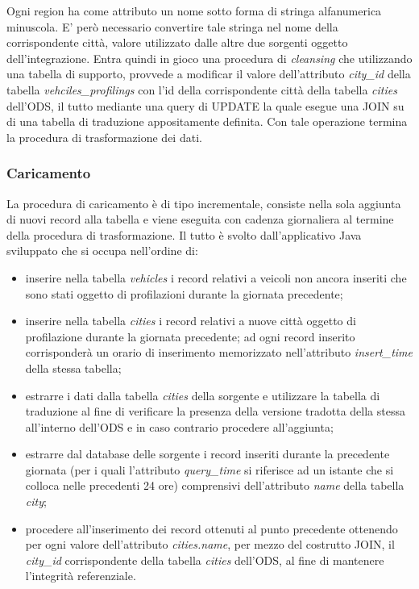 Ogni region ha come attributo un nome sotto forma di stringa alfanumerica
minuscola. E' però necessario convertire tale stringa nel nome
della corrispondente città, valore utilizzato dalle altre due sorgenti
oggetto dell'integrazione. Entra quindi in gioco una procedura di
\textit{cleansing} che utilizzando una tabella di supporto, provvede a
modificar il valore dell'attributo \textit{city\_id} della tabella
\textit{vehciles\_profilings} con l'id della corrispondente città della
tabella \textit{cities} dell'ODS, il tutto mediante una query di UPDATE
la quale esegue una JOIN su di una tabella di traduzione appositamente
definita. Con tale operazione termina la procedura di trasformazione dei dati.

\subsubsection{Caricamento}

La procedura di caricamento è di tipo incrementale, consiste nella sola aggiunta di
nuovi record alla tabella e viene eseguita con cadenza giornaliera al termine della
procedura di trasformazione. Il tutto è svolto dall'applicativo Java sviluppato che
si occupa nell'ordine di:
\begin{itemize}
\item inserire nella tabella \textit{vehicles} i record relativi a veicoli non ancora
inseriti che sono stati oggetto di profilazioni durante la giornata precedente;
\item inserire nella tabella \textit{cities} i record relativi a nuove città oggetto
di profilazione durante la giornata precedente; ad ogni record inserito corrisponderà
un orario di inserimento memorizzato nell'attributo \textit{insert\_time} della stessa
tabella;
\item estrarre i dati dalla tabella \textit{cities} della sorgente e utilizzare la
tabella di traduzione al fine di verificare la presenza della versione tradotta della
stessa all'interno dell'ODS e in caso contrario procedere all'aggiunta;
\item estrarre dal database delle sorgente i record inseriti durante la precedente
giornata (per i quali l'attributo \textit{query\_time} si riferisce ad un istante che
si colloca nelle precedenti 24 ore) comprensivi dell'attributo \textit{name} della
tabella \textit{city};
\item procedere all'inserimento dei record ottenuti al punto precedente ottenendo
per ogni valore dell'attributo \textit{cities.name}, per mezzo del costrutto JOIN,
il \textit{city\_id} corrispondente della tabella \textit{cities} dell'ODS, al fine
di mantenere l'integrità referenziale.
\end{itemize}

